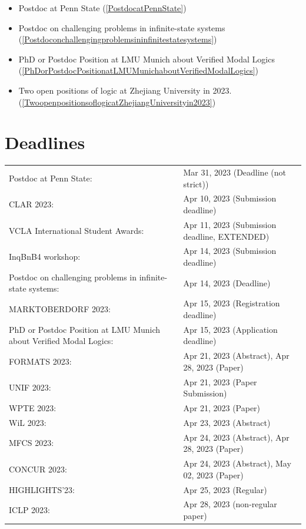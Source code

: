 \documentclass[prodmode,acmtecs]{acmsmall} %
\begin{document}
\begin{itemize}
\begin{itemize}\item Postdoc at Penn State (\cref{PostdocatPennState})
\item Postdoc on challenging problems in infinite-state systems (\cref{Postdoconchallengingproblemsininfinitestatesystems})
\item PhD or Postdoc Position at LMU Munich about Verified Modal Logics (\cref{PhDorPostdocPositionatLMUMunichaboutVerifiedModalLogics})
\item Two open positions of logic at Zhejiang University in 2023. (\cref{TwoopenpositionsoflogicatZhejiangUniversityin2023})
\end{itemize} 
\end{itemize}\section{Deadlines}\label{deadlines}\begin{tabulary}{\linewidth}{LL}Postdoc at Penn State:  & Mar 31, 2023 (Deadline (not strict)) \\
CLAR 2023:  & Apr 10, 2023 (Submission deadline) \\
VCLA International Student Awards:  & Apr 11, 2023 (Submission deadline, EXTENDED) \\
InqBnB4 workshop:  & Apr 14, 2023 (Submission deadline) \\
Postdoc on challenging problems in infinite-state systems:  & Apr 14, 2023 (Deadline) \\
MARKTOBERDORF 2023:  & Apr 15, 2023 (Registration deadline) \\
PhD or Postdoc Position at LMU Munich about Verified Modal Logics:  & Apr 15, 2023 (Application deadline) \\
FORMATS 2023:  & Apr 21, 2023 (Abstract), Apr 28, 2023 (Paper) \\
UNIF 2023:  & Apr 21, 2023 (Paper Submission) \\
WPTE 2023:  & Apr 21, 2023 (Paper) \\
WiL 2023:  & Apr 23, 2023 (Abstract) \\
MFCS 2023:  & Apr 24, 2023 (Abstract), Apr 28, 2023 (Paper) \\
CONCUR 2023:  & Apr 24, 2023 (Abstract), May 02, 2023 (Paper) \\
HIGHLIGHTS’23:  & Apr 25, 2023 (Regular) \\
ICLP 2023:  & Apr 28, 2023 (non-regular paper) \\

\end{tabulary}
\end{document}
